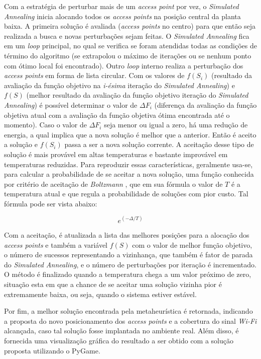 \documentclass[
	12pt,				%
	twoside,			%
	a4paper,			%
	english,			%
	french,				%
	spanish,			%
	brazil				%
	]{abntex2}
\begin{document}
Com a estratégia de perturbar mais de um \emph{access point} por vez, o
\emph{Simulated Annealing} inicia alocando todos os \emph{access points}
na posição central da planta baixa. A primeira solução é avaliada
(\emph{access points} no centro) para que então seja realizada a busca e
novas perturbações sejam feitas. O \emph{Simulated Annealing} fica em um
\emph{loop} principal, no qual se verifica se foram atendidas todas as
condições de término do algoritmo (se extrapolou o máximo de iterações
ou se nenhum ponto com ótimo local foi encontrado). Outro \emph{loop}
interno realiza a perturbação dos \emph{access points} em forma de lista
circular. Com os valores de \(f(S_{i})\) (resultado da avaliação da
função objetivo na \emph{i-ésima} iteração do \emph{Simulated
Annealing}) e \(f(S)\) (melhor resultado da avaliação da função objetivo
iteração do \emph{Simulated Annealing}) é possível determinar o valor de
\(\Delta F_{i}\) (diferença da avaliação da função objetiva atual com a
avaliação da função objetiva ótima encontrada até o momento). Caso o
valor de \(\Delta F_{i}\) seja menor ou igual a zero, há uma redução de
energia, a qual implica que a nova solução é melhor que a anterior.
Então é aceito a solução e \(f(S_{i})\) passa a ser a nova solução
corrente. A aceitação desse tipo de solução é mais provável em altas
temperaturas e bastante improvável em temperaturas reduzidas. Para
reproduzir essas características, geralmente usa-se, para calcular a
probabilidade de se aceitar a nova solução, uma função conhecida por
critério de aceitação de \emph{Boltzmann} \cite{AARTS}, que em sua
fórmula o valor de \(T\) é a temperatura atual e que regula a
probabilidade de soluções com pior custo. Tal fórmula pode ser vista
abaixo:

\begin{equation}
    e^{(-\Delta/T)}
\end{equation}

Com a aceitação, é atualizada a lista das melhores posições para a
alocação dos \emph{access points} e também a variável \(f(S)\) com o
valor de melhor função objetivo, o número de sucessos representando a
vizinhança, que também é fator de parada do \emph{Simulated Annealing},
e o número de perturbações por iteração é incrementado. O método é
finalizado quando a temperatura chega a um valor próximo de zero,
situação esta em que a chance de se aceitar uma solução vizinha pior é
extremamente baixa, ou seja, quando o sistema estiver estável.

Por fim, a melhor solução encontrada pela metaheurística é retornada,
indicando a proposta do novo posicionamento dos \emph{access points} e a
cobertura do sinal \emph{Wi-Fi} alcançada, caso tal solução fosse
implantada no ambiente real. Além disso, é fornecida uma visualização
gráfica do resultado a ser obtido com a solução proposta utilizando o
PyGame.
\end{document}
